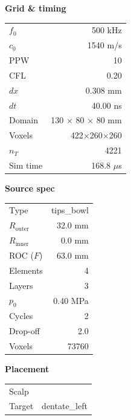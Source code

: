 \documentclass[11pt,letterpaper]{article}
\begin{document}
\begin{table}[h!]
\centering
\scriptsize
\setlength{\tabcolsep}{4pt}
\renewcommand{\arraystretch}{1.05}
\begin{minipage}[t]{0.32\linewidth}\centering
\textbf{Grid \& timing}\\[2pt]
\begin{tabular}{lr}
\toprule
$f_0$               & 500 kHz \\
$c_0$               & 1540 m/s \\
PPW                 & 10 \\
CFL                 & 0.20 \\
$dx$                & 0.308 mm \\
$dt$                & 40.00 ns \\
Domain              & 130 $\times$ 80 $\times$ 80 mm \\
Voxels              & 422$\times$260$\times$260 \\
$n_T$               & 4221 \\
Sim time            & 168.8 $\mu$s \\
\bottomrule
\end{tabular}
\end{minipage}\hfill
\begin{minipage}[t]{0.32\linewidth}\centering
\textbf{Source spec}\\[2pt]
\begin{tabular}{lr}
\toprule
Type             & tips\_bowl \\
$R_{\text{outer}}$ & 32.0 mm \\
$R_{\text{inner}}$ & 0.0 mm \\
ROC ($F$)        & 63.0 mm \\
Elements         & 4 \\
Layers           & 3 \\
$p_0$            & 0.40 MPa \\
Cycles           & 2 \\
Drop-off         & 2.0 \\
Voxels           & 73760 \\
\bottomrule
\end{tabular}
\end{minipage}\hfill
\begin{minipage}[t]{0.32\linewidth}\centering
\textbf{Placement}\\[2pt]
\begin{tabular}{lr}
\toprule
Scalp            &  \\
Target           & dentate\_left \\

\end{tabular}
\end{minipage}
\end{table}
\end{document}
